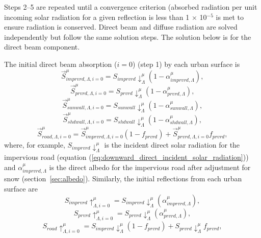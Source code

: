 \documentclass[12pt,authoryear]{elsarticle}
\numberwithin{equation}{section} %
\begin{document}
Steps 2--5 are repeated until a convergence criterion (absorbed radiation per unit incoming solar radiation for a given reflection is less than 1 $\times$ 10$^{-5}$ is met to ensure radiation is conserved. Direct beam and diffuse radiation are solved independently but follow the same solution steps. The solution below is for the direct beam component.

The initial direct beam absorption ($i = 0$) (step 1) by each urban surface is
\begin{equation}
\overrightarrow{S}_{imprvrd,\Lambda,i=0}^{\mu}=S_{imprvrd}\downarrow_{\Lambda}^{\mu}(1-\alpha_{imprvrd,\Lambda}^{\mu}),
\end{equation}
\begin{equation}
\overrightarrow{S}_{prvrd,\Lambda,i=0}^{\mu}=S_{prvrd}\downarrow_{\Lambda}^{\mu}(1-\alpha_{prvrd,\Lambda}^{\mu}),
\end{equation}
\begin{equation}
\overrightarrow{S}_{sunwall,\Lambda,i=0}^{\mu}=S_{sunwall}\downarrow_{\Lambda}^{\mu}(1-\alpha_{sunwall,\Lambda}^{\mu}),
\end{equation}
\begin{equation}
\overrightarrow{S}_{shdwall,\Lambda,i=0}^{\mu}=S_{shdwall}\downarrow_{\Lambda}^{\mu}(1-\alpha_{shdwall,\Lambda}^{\mu}),
\end{equation}
\begin{equation}
\overrightarrow{S}_{road,\Lambda,i=0}^{\mu}=\overrightarrow{S}_{imprvrd,\Lambda,i=0}^{\mu}(1-f_{prvrd})+\overrightarrow{S}_{prvrd,\Lambda,i=0}^{\mu}f_{prvrd},
\end{equation}
where, for example, $S_{imprvrd}\downarrow_{\Lambda}^{\mu}$ is the incident direct solar radiation for the impervious road (equation (\ref{eq:downward_direct_incident_solar_radiation})) and $\alpha_{imprvrd,\Lambda}^{\mu}$ is the direct albedo for the impervious road after adjustment for snow (section~\ref{sec:albedo}). Similarly, the initial reflections from each urban surface are
\begin{equation}
S_{imprvrd}\uparrow_{\Lambda,i=0}^{\mu}=S_{imprvrd}\downarrow_{\Lambda}^{\mu}(\alpha_{imprvrd,\Lambda}^{\mu}),
\end{equation}
\begin{equation}
S_{prvrd}\uparrow_{\Lambda,i=0}^{\mu}=S_{prvrd}\downarrow_{\Lambda}^{\mu}(\alpha_{prvrd,\Lambda}^{\mu}),
\end{equation}
\begin{equation}
S_{road}\uparrow_{\Lambda,i=0}^{\mu}=S_{imprvrd}\downarrow_{\Lambda}^{\mu}(1-f_{prvrd})+S_{prvrd}\downarrow_{\Lambda}^{\mu}f_{prvrd},
\end{equation}
\end{document}
